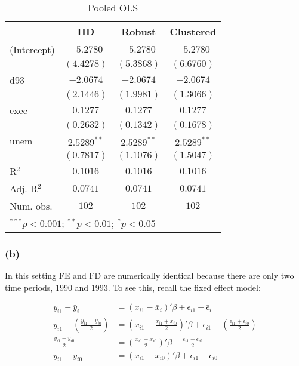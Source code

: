 \documentclass[
]{article}
\begin{document}
\begin{table}
\caption{Pooled OLS}
\begin{center}
\begin{tabular}{l c c c}
\hline
 & IID & Robust & Clustered \\
\hline
(Intercept) & $-5.2780$     & $-5.2780$     & $-5.2780$     \\
            & $(4.4278)$    & $(5.3868)$    & $(6.6760)$    \\
d93         & $-2.0674$     & $-2.0674$     & $-2.0674$     \\
            & $(2.1446)$    & $(1.9981)$    & $(1.3066)$    \\
exec        & $0.1277$      & $0.1277$      & $0.1277$      \\
            & $(0.2632)$    & $(0.1342)$    & $(0.1678)$    \\
unem        & $2.5289^{**}$ & $2.5289^{**}$ & $2.5289^{**}$ \\
            & $(0.7817)$    & $(1.1076)$    & $(1.5047)$    \\
\hline
R$^2$       & $0.1016$      & $0.1016$      & $0.1016$      \\
Adj. R$^2$  & $0.0741$      & $0.0741$      & $0.0741$      \\
Num. obs.   & $102$         & $102$         & $102$         \\
\hline
\multicolumn{4}{l}{\scriptsize{$^{***}p<0.001$; $^{**}p<0.01$; $^{*}p<0.05$}}
\end{tabular}
\label{table:coefficients}
\end{center}
\end{table}

\hypertarget{b-1}{%
\subsubsection{(b)}\label{b-1}}

In this setting FE and FD are numerically identical because there are
only two time periods, 1990 and 1993. To see this, recall the fixed
effect model:

\begin{align*}
  y_{i1} - \bar{y}_i &= (x_{i1} - \bar{x}_i)' \beta + \epsilon_{i1} - \bar{\epsilon}_i \\
  y_{i1} - \left( \frac{y_{i1}+y_{i0}}{2} \right) &= \left( x_{i1} - \frac{x_{i1}+x_{i0}}{2} \right)' \beta + \epsilon_{i1} - \left( \frac{\epsilon_{i1}+\epsilon_{i0}}{2} \right) \\
  \frac{y_{i1} - y_{i0}}{2} &= \left( \frac{x_{i1} - x_{i0}}{2} \right)' \beta + \frac{\epsilon_{i1} - \epsilon_{i0}}{2} \\
  y_{i1} - y_{i0} &= (x_{i1} - x_{i0})' \beta + \epsilon_{i1} - \epsilon_{i0}
\end{align*}
\end{document}
